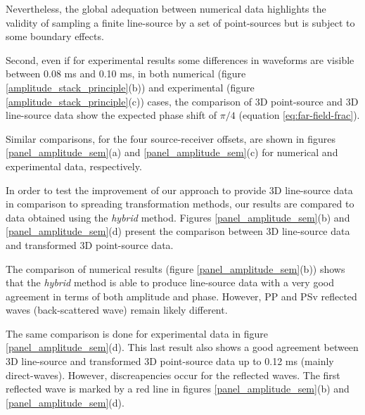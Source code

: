 \documentclass[manuscript,revised]{geophysics}
\begin{document}
\noindent Nevertheless, the global adequation between numerical data highlights the validity of sampling a finite line-source by a set of point-sources but is subject to some boundary effects.

\noindent Second, even if for experimental results some differences in waveforms are visible between 0.08 ms and 0.10 ms, in both numerical (figure \ref{amplitude_stack_principle}(b)) and experimental (figure \ref{amplitude_stack_principle}(c)) cases, the comparison of 3D point-source and 3D line-source data show the expected phase shift of $\pi/4$ (equation \ref{eq:far-field-frac}).

\noindent Similar comparisons, for the four source-receiver offsets, are shown in figures \ref{panel_amplitude_sem}(a) and  \ref{panel_amplitude_sem}(c) for numerical and experimental data, respectively.

\noindent In order to test the improvement of our approach to provide 3D line-source data in comparison to spreading transformation methods, our results are compared to data obtained using the \textit{hybrid} method. Figures \ref{panel_amplitude_sem}(b) and  \ref{panel_amplitude_sem}(d) present the comparison between 3D line-source data and transformed 3D point-source data.

\noindent The comparison of numerical results (figure \ref{panel_amplitude_sem}(b)) shows that the \textit{hybrid} method is able to produce line-source data with a very good agreement  in terms of both amplitude and phase. However, PP and PSv reflected waves (back-scattered wave) remain likely different.

\noindent The same comparison is done for experimental data in figure \ref{panel_amplitude_sem}(d). This last result also shows a good agreement between 3D line-source  and transformed 3D point-source data up to 0.12 ms (mainly direct-waves). However, discreapencies occur for the reflected waves. The first reflected wave is marked by a red line in figures \ref{panel_amplitude_sem}(b) and \ref{panel_amplitude_sem}(d).
 
\end{document}
